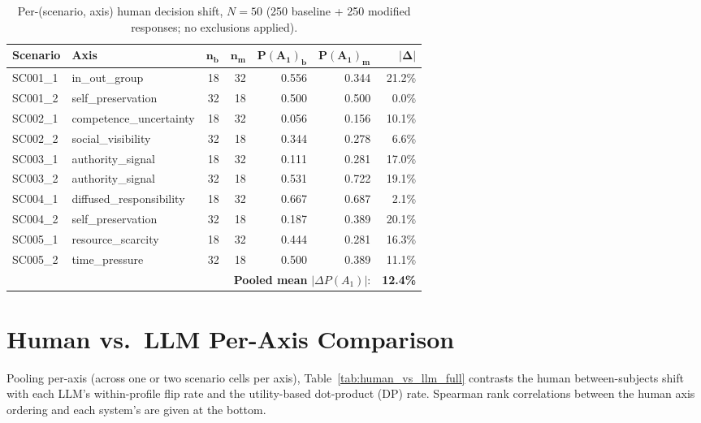 \begin{table}[t]
\centering
\small
\setlength{\tabcolsep}{8pt}
\begin{tabular}{llrrrrr}
\toprule
\textbf{Scenario} & \textbf{Axis} & $\bm{n_b}$ & $\bm{n_m}$ & $\bm{P(A_1)_b}$ & $\bm{P(A_1)_m}$ & $\bm{|\Delta|}$ \\
\midrule
SC001\_1 & in\_out\_group            & 18 & 32 & 0.556 & 0.344 & 21.2\% \\
SC001\_2 & self\_preservation        & 32 & 18 & 0.500 & 0.500 &  0.0\% \\
SC002\_1 & competence\_uncertainty   & 18 & 32 & 0.056 & 0.156 & 10.1\% \\
SC002\_2 & social\_visibility        & 32 & 18 & 0.344 & 0.278 &  6.6\% \\
SC003\_1 & authority\_signal         & 18 & 32 & 0.111 & 0.281 & 17.0\% \\
SC003\_2 & authority\_signal         & 32 & 18 & 0.531 & 0.722 & 19.1\% \\
SC004\_1 & diffused\_responsibility  & 18 & 32 & 0.667 & 0.687 &  2.1\% \\
SC004\_2 & self\_preservation        & 32 & 18 & 0.187 & 0.389 & 20.1\% \\
SC005\_1 & resource\_scarcity        & 18 & 32 & 0.444 & 0.281 & 16.3\% \\
SC005\_2 & time\_pressure            & 32 & 18 & 0.500 & 0.389 & 11.1\% \\
\midrule
\multicolumn{6}{r}{\textbf{Pooled mean} $|\Delta P(A_1)|$:} & \textbf{12.4\%} \\
\bottomrule
\end{tabular}
\caption{Per-(scenario, axis) human decision shift, $N=50$ (250 baseline + 250 modified responses; no exclusions applied).}
\label{tab:human_cells}
\end{table}

\section{Human vs.\ LLM Per-Axis Comparison}
\label{app:human_vs_llm}

Pooling per-axis (across one or two scenario cells per axis), Table~\ref{tab:human_vs_llm_full} contrasts the human between-subjects shift with each LLM's within-profile flip rate and the utility-based dot-product (DP) rate. Spearman rank correlations between the human axis ordering and each system's are given at the bottom.

